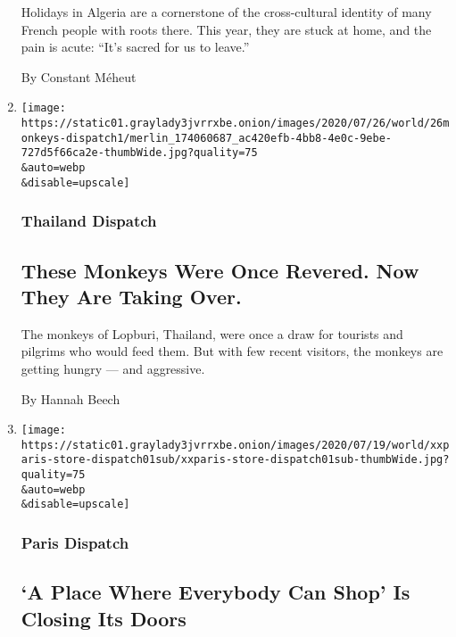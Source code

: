 \begin{enumerate}
  Holidays in Algeria are a cornerstone of the cross-cultural identity
  of many French people with roots there. This year, they are stuck at
  home, and the pain is acute: ``It's sacred for us to leave.''

  By Constant Méheut
\item
  \href{/2020/07/25/world/asia/thailand-monkeys.html}{}

  \texttt{[image: https://static01.graylady3jvrrxbe.onion/images/2020/07/26/world/26monkeys-dispatch1/merlin\_174060687\_ac420efb-4bb8-4e0c-9ebe-727d5f66ca2e-thumbWide.jpg?quality=75\\\&auto=webp\\\&disable=upscale]}

  \hypertarget{thailand-dispatch}{%
  \subsubsection{Thailand Dispatch}\label{thailand-dispatch}}

  \hypertarget{these-monkeys-were-once-revered-now-they-are-taking-over}{%
  \subsection{These Monkeys Were Once Revered. Now They Are Taking
  Over.}\label{these-monkeys-were-once-revered-now-they-are-taking-over}}

  The monkeys of Lopburi, Thailand, were once a draw for tourists and
  pilgrims who would feed them. But with few recent visitors, the
  monkeys are getting hungry --- and aggressive.

  By Hannah Beech
\item
  \href{/2020/07/20/world/europe/france-paris-tati-coronavirus.html}{}

  \texttt{[image: https://static01.graylady3jvrrxbe.onion/images/2020/07/19/world/xxparis-store-dispatch01sub/xxparis-store-dispatch01sub-thumbWide.jpg?quality=75\\\&auto=webp\\\&disable=upscale]}

  \hypertarget{paris-dispatch}{%
  \subsubsection{Paris Dispatch}\label{paris-dispatch}}

  \hypertarget{a-place-where-everybody-can-shop-is-closing-its-doors}{%
  \subsection{`A Place Where Everybody Can Shop' Is Closing Its
  Doors}\label{a-place-where-everybody-can-shop-is-closing-its-doors}}


\end{enumerate}
